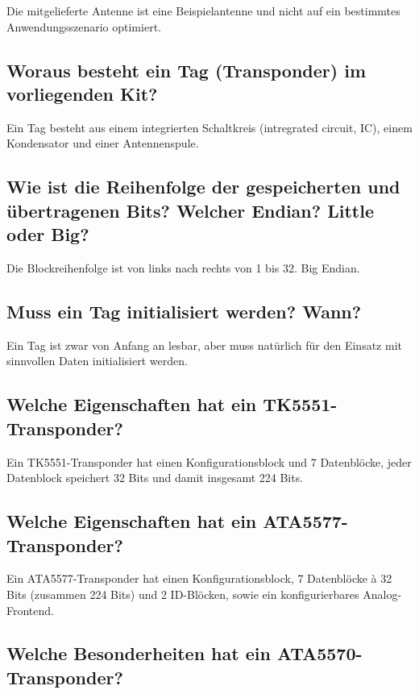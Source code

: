 \documentclass[paper=a4,fontsize=11pt,headsepline,footsepline,parskip=half]{scrartcl}
\begin{document}
Die mitgelieferte Antenne ist eine Beispielantenne und nicht auf ein bestimmtes
Anwendungsszenario optimiert. %

\subsection{Woraus besteht ein Tag (Transponder) im vorliegenden Kit?}

Ein Tag besteht aus einem integrierten Schaltkreis (intregrated circuit, IC), einem Kondensator und einer Antennenspule.

\subsection{Wie ist die Reihenfolge der gespeicherten und übertragenen Bits? Welcher Endian? Little oder Big?}

Die Blockreihenfolge ist von links nach rechts von 1 bis 32. Big Endian.

\subsection{Muss ein Tag initialisiert werden? Wann?}

Ein Tag ist zwar von Anfang an lesbar, aber muss natürlich für den Einsatz mit
sinnvollen Daten initialisiert werden.

\subsection{Welche Eigenschaften hat ein TK5551-Transponder?}

Ein TK5551-Transponder hat einen Konfigurationsblock und 7 Datenblöcke, jeder Datenblock speichert 32 Bits und damit insgesamt 224 Bits.

\subsection{Welche Eigenschaften hat ein ATA5577-Transponder?}

Ein ATA5577-Transponder hat einen Konfigurationsblock, 7 Datenblöcke à 32 Bits (zusammen 224 Bits) und 2 ID-Blöcken, sowie ein konfigurierbares
Analog-Frontend.

\subsection{Welche Besonderheiten hat ein ATA5570-Transponder?}
\end{document}
